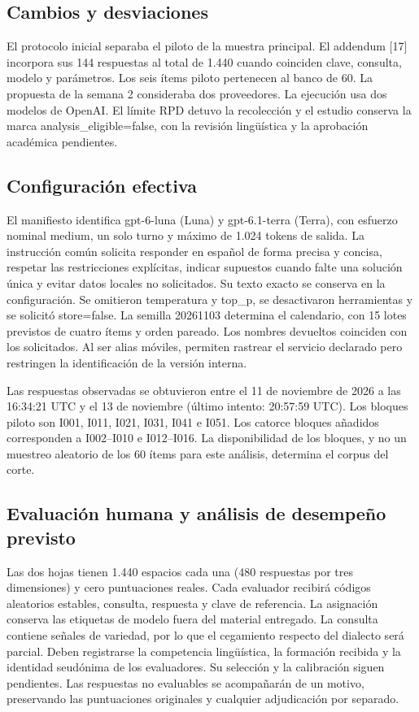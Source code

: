 \documentclass[conference]{IEEEtran}
\begin{document}
\subsection{Cambios y desviaciones}
El protocolo inicial separaba el piloto de la muestra principal. El addendum [17] incorpora sus 144 respuestas al total de 1.440 cuando coinciden clave, consulta, modelo y parámetros. Los seis ítems piloto pertenecen al banco de 60. La propuesta de la semana 2 consideraba dos proveedores. La ejecución usa dos modelos de OpenAI. El límite RPD detuvo la recolección y el estudio conserva la marca analysis\_eligible=false, con la revisión lingüística y la aprobación académica pendientes.

\subsection{Configuración efectiva}
El manifiesto identifica gpt-6-luna (Luna) y gpt-6.1-terra (Terra), con esfuerzo nominal medium, un solo turno y máximo de 1.024 tokens de salida. La instrucción común solicita responder en español de forma precisa y concisa, respetar las restricciones explícitas, indicar supuestos cuando falte una solución única y evitar datos locales no solicitados. Su texto exacto se conserva en la configuración. Se omitieron temperatura y top\_p, se desactivaron herramientas y se solicitó store=false. La semilla 20261103 determina el calendario, con 15 lotes previstos de cuatro ítems y orden pareado. Los nombres devueltos coinciden con los solicitados. Al ser alias móviles, permiten rastrear el servicio declarado pero restringen la identificación de la versión interna.

Las respuestas observadas se obtuvieron entre el 11 de noviembre de 2026 a las 16:34:21 UTC y el 13 de noviembre (último intento: 20:57:59 UTC). Los bloques piloto son I001, I011, I021, I031, I041 e I051. Los catorce bloques añadidos corresponden a I002--I010 e I012--I016. La disponibilidad de los bloques, y no un muestreo aleatorio de los 60 ítems para este análisis, determina el corpus del corte.

\subsection{Evaluación humana y análisis de desempeño previsto}
Las dos hojas tienen 1.440 espacios cada una (480 respuestas por tres dimensiones) y cero puntuaciones reales. Cada evaluador recibirá códigos aleatorios estables, consulta, respuesta y clave de referencia. La asignación conserva las etiquetas de modelo fuera del material entregado. La consulta contiene señales de variedad, por lo que el cegamiento respecto del dialecto será parcial. Deben registrarse la competencia lingüística, la formación recibida y la identidad seudónima de los evaluadores. Su selección y la calibración siguen pendientes. Las respuestas no evaluables se acompañarán de un motivo, preservando las puntuaciones originales y cualquier adjudicación por separado.
\end{document}
